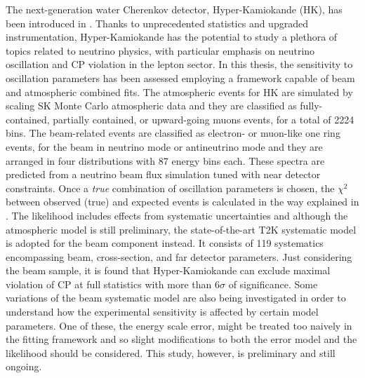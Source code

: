 The next-generation water Cherenkov detector, Hyper-Kamiokande (HK), has been introduced in .
Thanks to unprecedented statistics and upgraded instrumentation, Hyper-Kamiokande has the potential %
to study a plethora of topics related to neutrino physics, %
with particular emphasis on neutrino oscillation and CP violation in the lepton sector.
In this thesis, the sensitivity to oscillation parameters has been assessed %
employing a framework capable of beam and atmospheric combined fits.
The atmospheric events for HK are simulated by scaling SK Monte Carlo atmospheric data %
and they are classified as fully-contained, partially contained, or upward-going muons events, for a total of 2224 bins.
The beam-related events are classified as electron- or muon-like one ring events, %
for the beam in neutrino mode or antineutrino mode and they are arranged in four distributions with 87 energy bins each.
These spectra are predicted from a neutrino beam flux simulation tuned with near detector constraints.
Once a \emph{true} combination of oscillation parameters is chosen, the $\chi^2$ between observed (true) %
and expected events is calculated in the way explained in .
The likelihood includes effects from systematic uncertainties and %
although the atmospheric model is still preliminary, the state-of-the-art T2K systematic model %
is adopted for the beam component instead.
It consists of 119 systematics encompassing beam, cross-section, and far detector parameters.
Just considering the beam sample, it is found that Hyper-Kamiokande can exclude maximal %
violation of CP at full statistics with more than $6\sigma$ of significance.
Some variations of the beam systematic model are also being investigated in order to understand %
how the experimental sensitivity is affected by certain model parameters. 
One of these, the energy scale error, might be treated too naively in the fitting framework %
and so slight modifications to both the error model and the likelihood should be considered.
This study, however, is preliminary and still ongoing.


